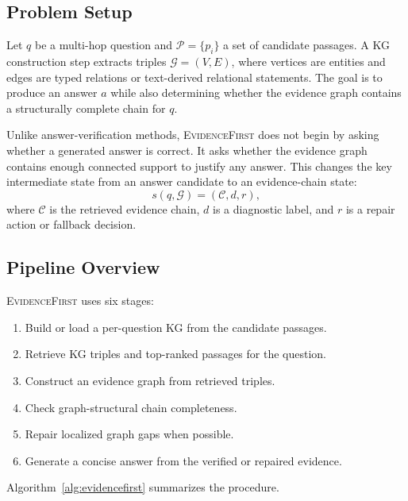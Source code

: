 \documentclass[runningheads]{llncs}
\newcommand{\sys}{\textsc{EvidenceFirst}\xspace}
\newcommand{\calG}{\mathcal{G}}
\newcommand{\calC}{\mathcal{C}}
\newcommand{\calP}{\mathcal{P}}
\begin{document}
\subsection{Problem Setup}
\label{sec:setup}

Let $q$ be a multi-hop question and $\calP=\{p_i\}$ a set of candidate
passages. A KG construction step extracts triples
$\calG=(V,E)$, where vertices are entities and edges are typed relations or
text-derived relational statements. The goal is to produce an answer $a$ while
also determining whether the evidence graph contains a structurally complete
chain for $q$.

Unlike answer-verification methods, \sys does not begin by asking whether a
generated answer is correct. It asks whether the evidence graph contains enough
connected support to justify any answer. This changes the key intermediate
state from an answer candidate to an evidence-chain state:
\[
    s(q,\calG) = (\calC, d, r),
\]
where $\calC$ is the retrieved evidence chain, $d$ is a diagnostic label, and
$r$ is a repair action or fallback decision.

\subsection{Pipeline Overview}
\label{sec:pipeline}

\sys uses six stages:
\begin{enumerate}
    \item Build or load a per-question KG from the candidate passages.
    \item Retrieve KG triples and top-ranked passages for the question.
    \item Construct an evidence graph from retrieved triples.
    \item Check graph-structural chain completeness.
    \item Repair localized graph gaps when possible.
    \item Generate a concise answer from the verified or repaired evidence.
\end{enumerate}

Algorithm~\ref{alg:evidencefirst} summarizes the procedure.
\end{document}
